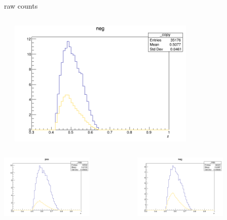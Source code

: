 \begin{frame}{raw counts}
\begin{columns}
\begin{column}[T]{0.25\textwidth}
\end{column}
\begin{column}[T]{0.25\textwidth}
\includegraphics[width = 0.7\textwidth]{results/yield/statistics/yield_x_Q2_z_0.45_4.750_0.50_neg.png}
\end{column}
\end{columns}
\begin{columns}
\begin{column}[T]{0.25\textwidth}
\includegraphics[width = 0.7\textwidth]{results/yield/statistics/yield_x_Q2_z_0.45_4.750_0.60_pos.png}
\end{column}
\begin{column}[T]{0.25\textwidth}
\includegraphics[width = 0.7\textwidth]{results/yield/statistics/yield_x_Q2_z_0.45_4.750_0.60_neg.png}

\end{column}
\end{columns}
\end{frame}
